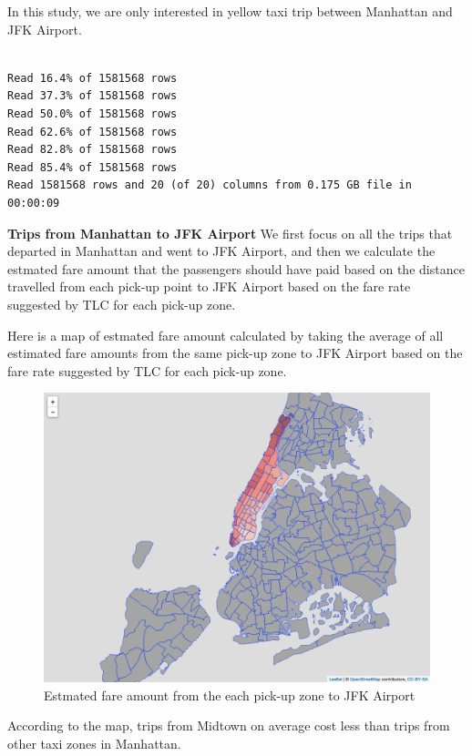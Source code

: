 \documentclass[12pt,twoside]{reedthesis}
\newenvironment{Shaded}{\begin{snugshade}}{\end{snugshade}}
\newcommand{\KeywordTok}[1]{\textcolor[rgb]{0.13,0.29,0.53}{\textbf{#1}}}
\newcommand{\DataTypeTok}[1]{\textcolor[rgb]{0.13,0.29,0.53}{#1}}
\newcommand{\DecValTok}[1]{\textcolor[rgb]{0.00,0.00,0.81}{#1}}
\newcommand{\StringTok}[1]{\textcolor[rgb]{0.31,0.60,0.02}{#1}}
\newcommand{\OtherTok}[1]{\textcolor[rgb]{0.56,0.35,0.01}{#1}}
\newcommand{\OperatorTok}[1]{\textcolor[rgb]{0.81,0.36,0.00}{\textbf{#1}}}
\newcommand{\NormalTok}[1]{#1}
\theoremstyle{definition}
\theoremstyle{definition}
\theoremstyle{definition}
\theoremstyle{remark}
\begin{document}
In this study, we are only interested in yellow taxi trip between
Manhattan and JFK Airport.
\begin{Shaded}
\end{Shaded}
\begin{verbatim}

Read 16.4% of 1581568 rows
Read 37.3% of 1581568 rows
Read 50.0% of 1581568 rows
Read 62.6% of 1581568 rows
Read 82.8% of 1581568 rows
Read 85.4% of 1581568 rows
Read 1581568 rows and 20 (of 20) columns from 0.175 GB file in 00:00:09
\end{verbatim}
\textbf{Trips from Manhattan to JFK Airport} We first focus on all the
trips that departed in Manhattan and went to JFK Airport, and then we
calculate the estmated fare amount that the passengers should have paid
based on the distance travelled from each pick-up point to JFK Airport
based on the fare rate suggested by TLC for each pick-up zone.

Here is a map of estmated fare amount calculated by taking the average
of all estimated fare amounts from the same pick-up zone to JFK Airport
based on the fare rate suggested by TLC for each pick-up zone.
\begin{figure}

{\centering \includegraphics[width=4.96in]{figure/to_jkf_fare_vis} 

}

\caption{Estmated fare amount from the each pick-up zone to JFK Airport}\label{fig:to-jkf-fare-vis}
\end{figure}
According to the map, trips from Midtown on average cost less than trips
from other taxi zones in Manhattan.
\end{document}
